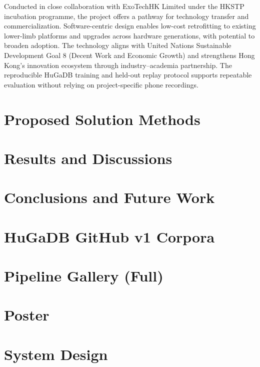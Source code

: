 \documentclass[12pt,a4paper]{report}
\begin{document}
Conducted in close collaboration with ExoTechHK Limited under the HKSTP incubation programme, the project offers a pathway for technology transfer and commercialization. Software-centric design enables low-cost retrofitting to existing lower-limb platforms and upgrades across hardware generations, with potential to broaden adoption. The technology aligns with United Nations Sustainable Development Goal 8 (Decent Work and Economic Growth) and strengthens Hong Kong's innovation ecosystem through industry--academia partnership. The reproducible HuGaDB training and held-out replay protocol supports repeatable evaluation without relying on project-specific phone recordings.



\chapter{Proposed Solution Methods}


\chapter{Results and Discussions}


\chapter{Conclusions and Future Work}


\clearpage


\appendix
\chapter{HuGaDB GitHub v1 Corpora}


\chapter{Pipeline Gallery (Full)}


\chapter{Poster}


\chapter{System Design}

\end{document}
